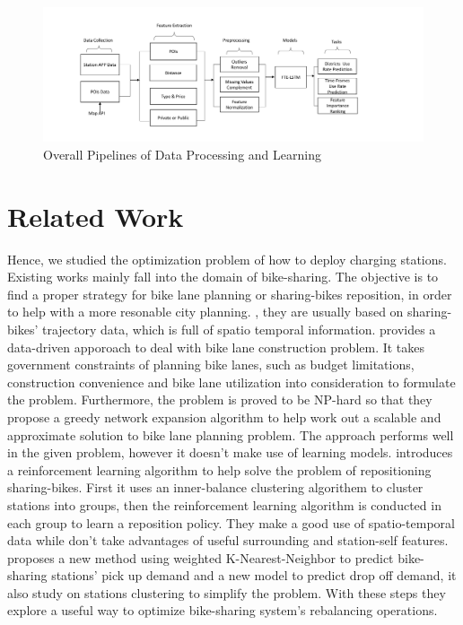 \documentclass[runningheads]{llncs}
\begin{document}
\begin{figure}[!htp]
	\includegraphics[width=\columnwidth]{./figures/pipeline.pdf}
	\centering
	\caption{Overall Pipelines of Data Processing and Learning}
	\label{fig2}
\end{figure}

\section{Related Work}

Hence, we studied the optimization problem of how to deploy charging stations. Existing works \cite{Bao:2017,Liu:2018:DSB,Yang:2016:MMP,Li:2018:DBR,Liu:2016:RB} mainly fall into the domain of bike-sharing. The objective is to find a proper strategy for bike lane planning or sharing-bikes reposition, in order to help with a more resonable city planning. \cite{Bao:2016,Chen:2011,Jiang:2016,Li:2016}, they are usually based on sharing-bikes' trajectory data, which is full of spatio temporal information. \cite{Bao:2017} provides a data-driven apporoach to deal with bike lane construction problem. It takes government constraints of planning bike lanes, such as budget limitations, construction convenience and bike lane utilization into consideration to formulate the problem. Furthermore, the problem is proved to be NP-hard so that they propose a greedy network expansion algorithm to help work out a scalable and approximate solution to bike lane planning problem. The approach performs well in the given problem, however it doesn't make use of learning models. \cite{Li:2018:DBR} introduces a reinforcement learning algorithm to help solve the problem of repositioning sharing-bikes. First it uses an inner-balance clustering algorithem to cluster stations into groups, then the reinforcement learning algorithm is conducted in each group to learn a reposition policy. They make a good use of spatio-temporal data while don't take advantages of useful surrounding and station-self features. \cite{Liu:2016:RB} proposes a new method using weighted K-Nearest-Neighbor to predict bike-sharing stations' pick up demand and a new model to predict drop off demand, it also study on stations clustering to simplify the problem. With these steps they explore a useful way to optimize bike-sharing system's rebalancing operations.
\end{document}
